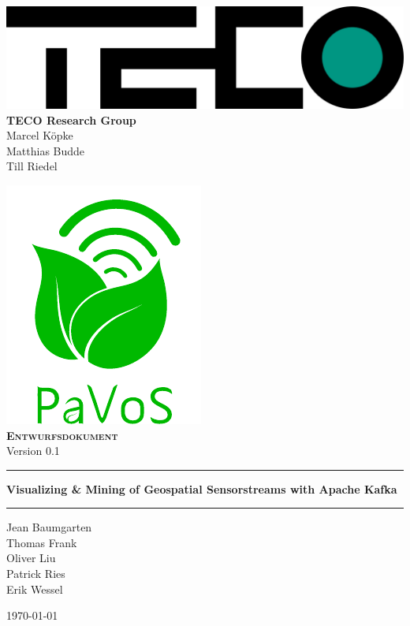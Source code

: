 \begin{titlepage}
	\begin{center}
	\includegraphics[width=0.5\linewidth]{images/TECOLogo.png}\\[0.2cm]

	\textbf{TECO Research Group}\\[0.2cm]
	Marcel Köpke\\Matthias Budde\\Till Riedel\\
	\vspace{1cm}
	
	\includegraphics[width=0.33\linewidth]{images/PaVoSLogo-Erweitert}\\[1cm]
	
	\textsc{\textbf{\LARGE Entwurfsdokument}}\\
	{\small Version 0.1}\\
	
	\vspace{1cm}\hrule\vspace{0.4cm}
	\textbf{\huge Visualizing \& Mining of Geospatial Sensorstreams with Apache Kafka}\\
	\vspace{0.4cm}\hrule\vspace{1cm}
	
	{\Large Jean Baumgarten\\
	Thomas Frank\\
	Oliver Liu\\
	Patrick Ries\\
	Erik Wessel\\}

	\vspace{1cm}
	\today
	
	\end{center}
\end{titlepage}